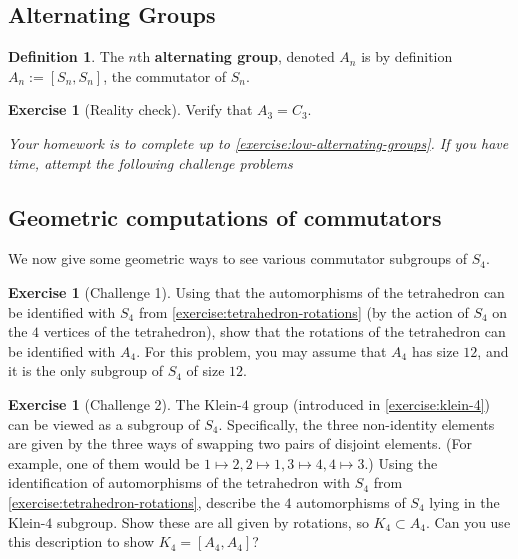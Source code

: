 \documentclass[reqno, 12pt, letter]{article}
\theoremstyle{plain}
\theoremstyle{definition}
\newtheorem{definition}[theorem]{Definition}
\newtheorem{exercise}[theorem]{Exercise}
\theoremstyle{remark}
\numberwithin{equation}{section}
\begin{document}

\subsection{Alternating Groups}

\begin{definition}
	\label{definition:}
	The $n$th {\bf alternating group}, denoted $A_n$ is by definition $A_n := \left[ S_n, S_n \right]$, the commutator of $S_n$.
\end{definition}
\begin{exercise}[Reality check]
	\label{exercise:low-alternating-groups}
	Verify that $A_3 = C_3$.	
\end{exercise}

{\it Your homework is to complete up to \autoref{exercise:low-alternating-groups}. If you have time, attempt the following challenge
problems}

\subsection{Geometric computations of commutators}
We now give some geometric ways to see various commutator subgroups of $S_4$.
\begin{exercise}[Challenge 1]
	\label{exercise:}
	Using that the automorphisms of the tetrahedron can be identified with $S_4$ from \autoref{exercise:tetrahedron-rotations} (by the action of
	$S_4$ on the $4$ vertices of the tetrahedron), 
	show that the rotations of the tetrahedron can be identified with $A_4$. For this problem, you may assume that $A_4$ has size $12$, and
		it is the only subgroup of $S_4$ of size $12$.
\end{exercise}
\begin{exercise}[Challenge 2]
	\label{exercise:}
	The Klein-$4$ group (introduced in \autoref{exercise:klein-4})
	can be viewed as a subgroup of $S_4$. Specifically, the three non-identity elements are
	given by the three ways of swapping two pairs of disjoint elements. (For example, one of them would be $1 \mapsto 2, 2 \mapsto 1, 3\mapsto 4, 4 \mapsto 3$.)
	Using the identification of automorphisms of the tetrahedron with $S_4$ from \autoref{exercise:tetrahedron-rotations},
	describe the $4$ automorphisms of $S_4$ lying in the Klein-$4$ subgroup.
	Show these are all given by rotations, so $K_4 \subset A_4$.
	Can you use this description to show $K_4 = \left[ A_4, A_4 \right]$?
\end{exercise}
\end{document}
